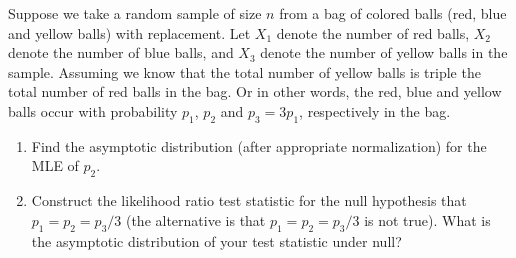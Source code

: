 \begin{exercise}\label{probability:2014:5}
Suppose we take a random sample of size $n$ from a bag of colored balls (red, blue and yellow balls) with replacement. Let $X_1$ denote the number of red balls, $X_2$ denote the number of blue balls, and $X_3$ denote the number of yellow balls in the sample. Assuming we know that the total number of yellow balls is triple the total number of red balls in the bag. Or in other words, the red, blue and yellow balls occur with probability $p_1$, $p_2$ and $p_3 = 3p_1$, respectively in the bag.

\begin{enumerate}
    \item Find the asymptotic distribution (after appropriate normalization) for the MLE of $p_2$.
    \item Construct the likelihood ratio test statistic for the null hypothesis that $p_1 = p_2 = p_3/3$ (the alternative is that $p_1 = p_2 = p_3/3$ is not true). What is the asymptotic distribution of your test statistic under null?
\end{enumerate}
\end{exercise}

